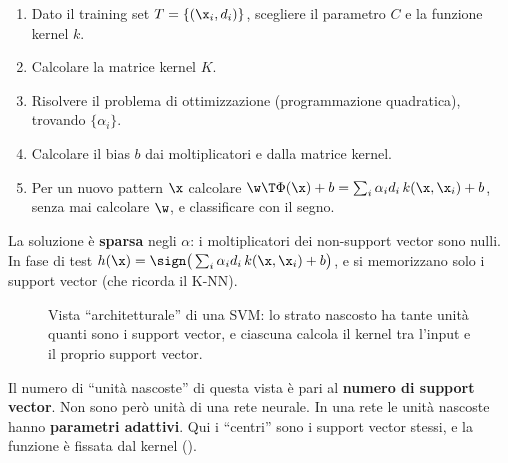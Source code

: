 \begin{algoritmo}
\begin{enumerate}
  \item Dato il training set $T=\{(\x_i,d_i)\}$, scegliere il parametro $C$ e la funzione kernel $k$.
  \item Calcolare la matrice kernel $K$.
  \item Risolvere il problema di ottimizzazione (programmazione quadratica), trovando $\{\alpha_i\}$.
  \item Calcolare il bias $b$ dai moltiplicatori e dalla matrice kernel.
  \item Per un nuovo pattern $\x$ calcolare $\w\T\Phi(\x) + b = \sum_i\alpha_id_i\,k(\x,\x_i) + b$, senza mai
        calcolare $\w$, e classificare con il segno.
\end{enumerate}
\end{algoritmo}

La soluzione è \textbf{sparsa} negli $\alpha$: i moltiplicatori dei non-support vector sono nulli. In fase di test
$h(\x) = \sign\big(\sum_i\alpha_id_i\,k(\x,\x_i)+b\big)$, e si memorizzano solo i support vector (che ricorda il
K-NN).

\begin{figure}[ht]
\centering
{}
\caption{Vista ``architetturale'' di una SVM: lo strato nascosto ha tante unità quanti sono i support vector, e
ciascuna calcola il kernel tra l'input e il proprio support vector.}
\label{fig:svm-architettura}
\end{figure}

Il numero di ``unità nascoste'' di questa vista è pari al \textbf{numero di support vector}. Non sono però unità
di una rete neurale. In una rete le unità nascoste hanno \textbf{parametri adattivi}. Qui i ``centri'' sono i
support vector stessi, e la funzione è fissata dal kernel ().

